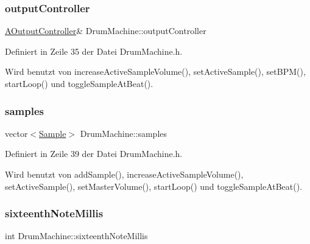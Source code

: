 \subsubsection{\texorpdfstring{output\+Controller}{outputController}}
{\footnotesize\ttfamily \hyperlink{class_a_output_controller}{A\+Output\+Controller}\& Drum\+Machine\+::output\+Controller\hspace{0.3cm}{\ttfamily [private]}}



Definiert in Zeile 35 der Datei Drum\+Machine.\+h.



Wird benutzt von increase\+Active\+Sample\+Volume(), set\+Active\+Sample(), set\+B\+P\+M(), start\+Loop() und toggle\+Sample\+At\+Beat().

\mbox{\label{class_drum_machine_acf215ead70c41e760556497281aa562e}} 
\subsubsection{\texorpdfstring{samples}{samples}}
{\footnotesize\ttfamily vector$<$\hyperlink{class_sample}{Sample}$>$ Drum\+Machine\+::samples\hspace{0.3cm}{\ttfamily [private]}}



Definiert in Zeile 39 der Datei Drum\+Machine.\+h.



Wird benutzt von add\+Sample(), increase\+Active\+Sample\+Volume(), set\+Active\+Sample(), set\+Master\+Volume(), start\+Loop() und toggle\+Sample\+At\+Beat().

\mbox{\label{class_drum_machine_a55ad96f0aa2452d631e49bcdde9fd538}} 
\subsubsection{\texorpdfstring{sixteenth\+Note\+Millis}{beatMillis}}
{\footnotesize\ttfamily int Drum\+Machine\+::sixteenth\+Note\+Millis\hspace{0.3cm}{\ttfamily [private]}}



